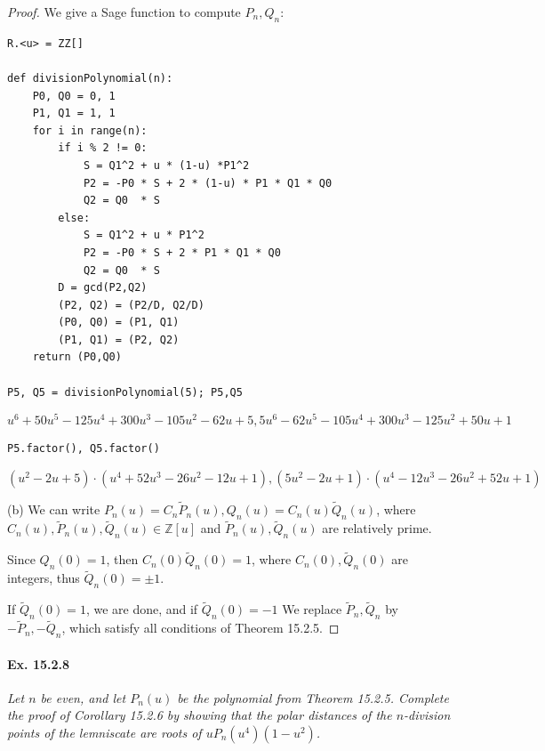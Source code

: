 \documentclass[11pt,a4paper]{article}
\newcommand{\Z}{\mathbb{Z}}
\begin{document}
\begin{proof}
\bigskip

We give a Sage function to compute $P_n,Q_n$:
\begin{verbatim}
R.<u> = ZZ[]

def divisionPolynomial(n):
    P0, Q0 = 0, 1
    P1, Q1 = 1, 1
    for i in range(n):
        if i % 2 != 0:
            S = Q1^2 + u * (1-u) *P1^2
            P2 = -P0 * S + 2 * (1-u) * P1 * Q1 * Q0
            Q2 = Q0  * S
        else:
            S = Q1^2 + u * P1^2
            P2 = -P0 * S + 2 * P1 * Q1 * Q0
            Q2 = Q0  * S
        D = gcd(P2,Q2)
        (P2, Q2) = (P2/D, Q2/D)
        (P0, Q0) = (P1, Q1)
        (P1, Q1) = (P2, Q2)
    return (P0,Q0)
    
P5, Q5 = divisionPolynomial(5); P5,Q5
\end{verbatim}
$$u^{6} + 50u^{5} - 125u^{4} + 300u^{3} - 105u^{2} - 62u + 5,  5u^{6} - 62u^{5} - 105u^{4} + 300u^{3} - 125u^{2} + 50u + 1$$
\begin{verbatim}
P5.factor(), Q5.factor()
\end{verbatim}
$$(u^{2} - 2u + 5) \cdot (u^{4} + 52u^{3} - 26u^{2} - 12u + 1), (5u^{2} - 2u + 1) \cdot (u^{4} - 12u^{3} - 26u^{2} + 52u + 1)$$
\item[(b)] We can write $P_n(u) = C_n \tilde{P}_n(u), Q_n(u) = C_n(u) \tilde{Q}_n(u)$, where $C_n(u), \tilde P_n(u),\tilde Q_n(u) \in \Z[u]$ and $\tilde P_n(u), \tilde Q_n(u)$ are relatively prime.

Since $Q_n(0) = 1$, then $C_n(0) \tilde{Q}_n(0) = 1$, where $C_n(0), \tilde{Q}_n(0)$ are integers, thus $\tilde{Q}_n(0) = \pm 1$.

If $\tilde{Q}_n(0) = 1$, we are done, and if $\tilde{Q}_n(0) = -1$ We replace $\tilde{P}_n, \tilde{Q}_n$ by $-\tilde{P}_n, - \tilde{Q}_n$, which satisfy all conditions of Theorem 15.2.5.
\end{proof}

\paragraph{Ex. 15.2.8}{\it Let $n$ be even, and let $P_n(u)$ be the polynomial from Theorem 15.2.5. Complete the proof of Corollary 15.2.6 by showing that the polar distances of the $n$-division points of the lemniscate are roots of $uP_n(u^4)(1-u^2)$.
}
\end{document}
